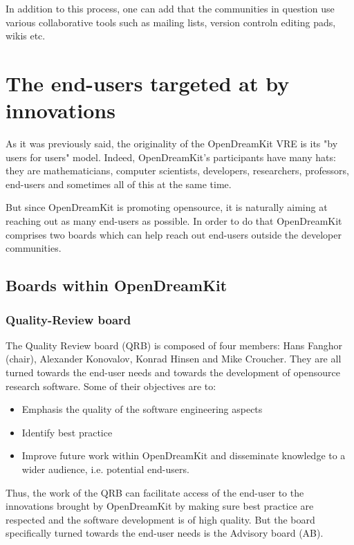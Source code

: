 \documentclass{deliverablereport}
\begin{document}
In addition to this process, one can add that the communities in question use various collaborative tools such as mailing lists, version controln editing pads, wikis etc.

\section{The end-users targeted at by innovations}

As it was previously said, the originality of the OpenDreamKit VRE is its "by users for users" model. Indeed, OpenDreamKit's participants have many hats: they are mathematicians, computer scientists, developers, researchers, professors, end-users and sometimes all of this at the same time. 

But since OpenDreamKit is promoting opensource, it is naturally aiming at reaching out as many end-users as possible. In order to do that OpenDreamKit comprises two boards which can help reach out end-users outside the developer communities.

\subsection{Boards within OpenDreamKit}

\subsubsection{Quality-Review board}

The Quality Review board (QRB) is composed of four members: Hans Fanghor (chair), Alexander Konovalov, Konrad Hinsen and Mike Croucher. They are all turned towards the end-user needs and towards the development of opensource research software.
Some of their objectives are to:

\begin{itemize}
\item{Emphasis the quality of the software engineering aspects}
\item{Identify best practice}
\item{Improve future work within OpenDreamKit and disseminate knowledge to a wider audience, i.e. potential end-users.}
\end{itemize}
  
Thus, the work of the QRB can facilitate access of the end-user to the innovations brought by OpenDreamKit by making sure best practice are respected and the software development is of high quality. But the board specifically turned towards the end-user needs is the Advisory board (AB).
\end{document}
